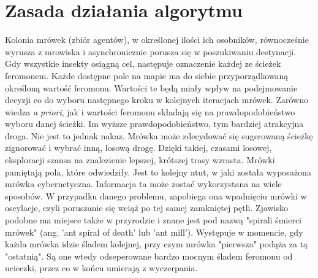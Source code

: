 \documentclass[printmode, openany, oneside, eng]{mgr}
\begin{document}
\section{Zasada działania algorytmu}\label{sec:algorytmMetaH}
Kolonia mrówek (zbiór agentów), w określonej ilości ich osobników, równocześnie wyrusza z mrowiska i asynchronicznie porusza się w poszukiwaniu destynacji. Gdy wszystkie insekty osiągną cel, następuje oznaczenie każdej ze ścieżek feromonem. Każde dostępne pole na mapie ma do siebie przyporządkowaną określoną wartość feromonu. Wartości te będą miały wpływ na podejmowanie decyzji co do wyboru następnego kroku w kolejnych iteracjach mrówek. 
\newline 
Zarówno wiedza \textit{a priori}, jak i wartości feromonu składają się na prawdopodobieństwo wyboru danej ścieżki. Im wyższe prawdopodobieństwo, tym bardziej atrakcyjna droga. Nie jest to jednak nakaz. Mrówka może zdecydować się sugerowaną ścieżkę zignorować i wybrać inną, losową drogę. Dzięki takiej, czasami losowej, eksploracji szansa na znalezienie lepszej, krótszej trasy wzrasta.
\newline
 Mrówki pamiętają pola, które odwiedziły. Jest to kolejny atut, w jaki została wyposażona mrówka cybernetyczna. Informacja ta może zostać wykorzystana na wiele sposobów. W przypadku danego problemu, zapobiega ona wpadnięciu mrówki w oscylacje, czyli poruszanie się wciąż po tej samej zamkniętej pętli. Zjawisko podobne ma miejsce także w przyrodzie i znane jest pod nazwą "spirali śmierci mrówek" (ang. 'ant spiral of death' lub 'ant mill'). Występuje w momencie, gdy każda mrówka idzie śladem kolejnej, przy czym mrówka "pierwsza" podąża za tą "ostatnią". Są one wtedy odseperowane bardzo mocnym śladem feromonu od ucieczki, przez co w końcu umierają z wyczerpania.
\end{document}
